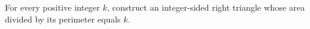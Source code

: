 For every positive integer $k$, construct an integer-sided right triangle whose area divided by its perimeter equals $k$.
